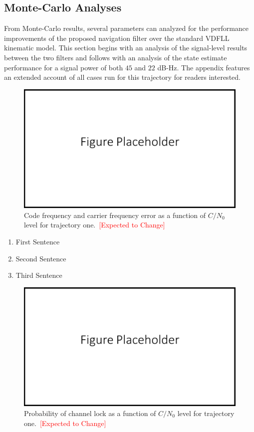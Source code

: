 \subsection{\textbf{Monte-Carlo Analyses}}
From Monte-Carlo results, several parameters can analyzed for the performance improvements of the proposed navigation filter over the standard VDFLL kinematic model. This section begins with an analysis of the signal-level results between the two filters and follows with an analysis of the state estimate performance for a signal power of both \(45\) and \(22\) dB-Hz. The appendix features an extended account of all cases run for this trajectory for readers interested.
\begin{figure}[!ht]
    \centering
    \includegraphics[width=0.5\linewidth]{Figures/FigurePlaceholder.png}
    \caption{Code frequency and carrier frequency error as a function of \(C/N_0\) level for trajectory one.~\textcolor{red}{[Expected to Change]}}\label{fig:truecodefreqerrror1}
\end{figure}

\begin{enumerate}
    \item First Sentence
    \item Second Sentence
    \item Third Sentence
\end{enumerate}

\begin{figure}[!ht]
    \centering
    \includegraphics[width=0.5\linewidth]{Figures/FigurePlaceholder.png}
    \caption{Probability of channel lock as a function of \(C/N_0\) level for trajectory one.~\textcolor{red}{[Expected to Change]}}\label{fig:trackingprobability1}
\end{figure}

